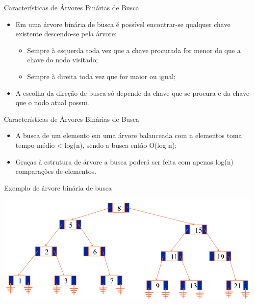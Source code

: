 \documentclass[12pt,table,xcolor={dvipsnames}]{beamer}
\begin{document}
\begin{frame}[fragile]{Características de Árvores Binárias de Busca}
          \begin{itemize}
          \item Em uma árvore binária de busca é possível encontrar-se qualquer chave existente descendo-se pela árvore:
          \begin{itemize}
          \item Sempre à esquerda toda vez que a chave procurada for menor do que a chave do nodo visitado;
          \item Sempre à direita toda vez que for maior ou igual;
          \end{itemize}
          \item A escolha da direção de busca só depende da chave que se procura e da chave que o nodo atual possui.
       	  \end{itemize}
\end{frame}

\begin{frame}[fragile]{Características de Árvores Binárias de Busca}
          \begin{itemize}
          \item A busca de um elemento em uma árvore balanceada com n elementos toma tempo médio < log(n), sendo a busca então O(log n);
          \item Graças à estrutura de árvore a busca poderá ser feita com apenas log(n) comparações de elementos.
       	  \end{itemize}
\end{frame}

\begin{frame}[fragile]{Exemplo de árvore binária de busca}
\begin{center}
\includegraphics[scale=.3]{arv1.png} 
\end{center}
\end{frame}
\end{document}
